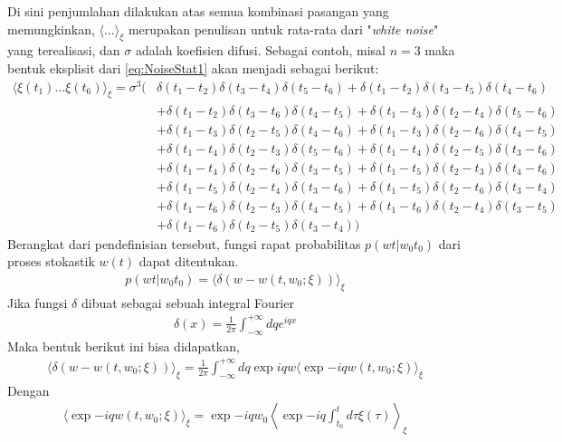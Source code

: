Di sini penjumlahan dilakukan atas semua kombinasi pasangan yang memungkinkan, \(\langle...\rangle_\xi\) merupakan penulisan untuk rata-rata dari "\textit{white noise}" yang terealisasi, dan \(\sigma\) adalah koefisien difusi. Sebagai contoh, misal \(n=3\) maka bentuk eksplisit dari \ref{eq:NoiseStat1} akan menjadi sebagai berikut:
\begin{align}
    \langle \xi(t_1) ... \xi(t_6) \rangle_\xi = \sigma^3 \Big( & \delta(t_1 - t_2) \delta(t_3 - t_4) \delta(t_5 - t_6) + \delta(t_1 - t_2) \delta(t_3 - t_5) \delta(t_4 - t_6) \nonumber \\
    & + \delta(t_1 - t_2) \delta(t_3 - t_6) \delta(t_4 - t_5) + \delta(t_1 - t_3) \delta(t_2 - t_4) \delta(t_5 - t_6) \nonumber \\
    & + \delta(t_1 - t_3) \delta(t_2 - t_5) \delta(t_4 - t_6) + \delta(t_1 - t_3) \delta(t_2 - t_6) \delta(t_4 - t_5) \nonumber \\
    & + \delta(t_1 - t_4) \delta(t_2 - t_3) \delta(t_5 - t_6) + \delta(t_1 - t_4) \delta(t_2 - t_5) \delta(t_3 - t_6) \nonumber \\
    & + \delta(t_1 - t_4) \delta(t_2 - t_6) \delta(t_3 - t_5) + \delta(t_1 - t_5) \delta(t_2 - t_3) \delta(t_4 - t_6) \nonumber \\
    & + \delta(t_1 - t_5) \delta(t_2 - t_4) \delta(t_3 - t_6) + \delta(t_1 - t_5) \delta(t_2 - t_6) \delta(t_3 - t_4) \nonumber \\
    & + \delta(t_1 - t_6) \delta(t_2 - t_3) \delta(t_4 - t_5) + \delta(t_1 - t_6) \delta(t_2 - t_4) \delta(t_3 - t_5) \nonumber \\
    & + \delta(t_1 - t_6) \delta(t_2 - t_5) \delta(t_3 - t_4) \Big)
\end{align}
Berangkat dari pendefinisian tersebut, fungsi rapat probabilitas \(p(wt|w_0t_0)\) dari proses stokastik \(w(t)\) dapat ditentukan.
\begin{align}
    p(wt|w_0t_0) = \langle\delta(w - w(t,w_0;\xi))\rangle_\xi
\end{align}
Jika fungsi \(\delta\) dibuat sebagai sebuah integral Fourier
\begin{align}
    \delta(x) = \frac{1}{2\pi}\int_{-\infty}^{+\infty} dqe^{iqx}
\end{align}
Maka bentuk berikut ini bisa didapatkan,
\begin{align}
    \langle \delta(w - w(t,w_0;\xi)) \rangle_\xi = \frac{1}{2\pi} \int_{-\infty}^{+\infty} dq \exp{iqw} \langle \exp{-iqw(t,w_0;\xi)} \rangle_\xi
\end{align}
Dengan
\begin{align}
    \langle \exp{-iqw(t,w_0;\xi)} \rangle_\xi = \exp{-iqw_0}\left\langle \exp{-iq\int_{t_0}^t d\tau \xi(\tau)} \right\rangle_\xi \label{eq:<iqw>_xi}
\end{align}

